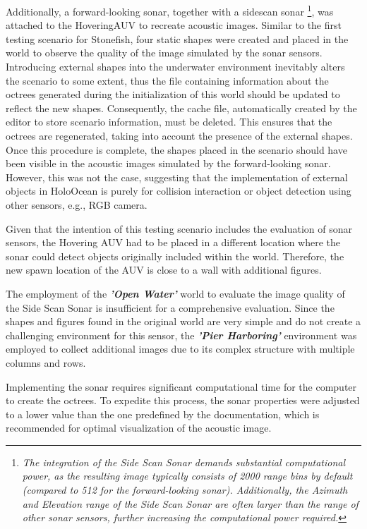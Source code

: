 \documentclass[]{article}
\begin{document}
	Additionally, a forward-looking sonar, together with a sidescan sonar \footnote[8]{\textit{The integration of the Side Scan Sonar demands substantial computational power, as the resulting image typically consists of 2000 range bins by default (compared to 512 for the forward-looking sonar). Additionally, the Azimuth and Elevation range of the Side Scan Sonar are often larger than the range of other sonar sensors, further increasing the computational power required.}}, was attached to the HoveringAUV to recreate acoustic images. Similar to the first testing scenario for Stonefish, four static shapes were created and placed in the world to observe the quality of the image simulated by the sonar sensors. Introducing external shapes into the underwater environment inevitably alters the scenario to some extent, thus the file containing information about the octrees generated during the initialization of this world should be updated to reflect the new shapes. Consequently, the cache file, automatically created by the editor to store scenario information, must be deleted. This ensures that the octrees are regenerated, taking into account the presence of the external shapes. Once this procedure is complete, the shapes placed in the scenario should have been visible in the acoustic images simulated by the forward-looking sonar. However, this was not the case, suggesting that the implementation of external objects in HoloOcean is purely for collision interaction or object detection using other sensors, e.g., RGB camera.
	
	Given that the intention of this testing scenario includes the evaluation of sonar sensors, the Hovering AUV had to be placed in a different location where the sonar could detect objects originally included within the world. Therefore, the new spawn location of the AUV is close to a wall with additional figures.
	
	The employment of the \textbf{\textit{'Open Water'}} world to evaluate the image quality of the Side Scan Sonar is insufficient for a comprehensive evaluation. Since the shapes and figures found in the original world are very simple and do not create a challenging environment for this sensor, the \textbf{\textit{'Pier Harboring'}} environment was employed to collect additional images due to its complex structure with multiple columns and rows.
	
	Implementing the sonar requires significant computational time for the computer to create the octrees. To expedite this process, the sonar properties were adjusted to a lower value than the one predefined by the documentation, which is recommended for optimal visualization of the acoustic image.
	
\end{document}
